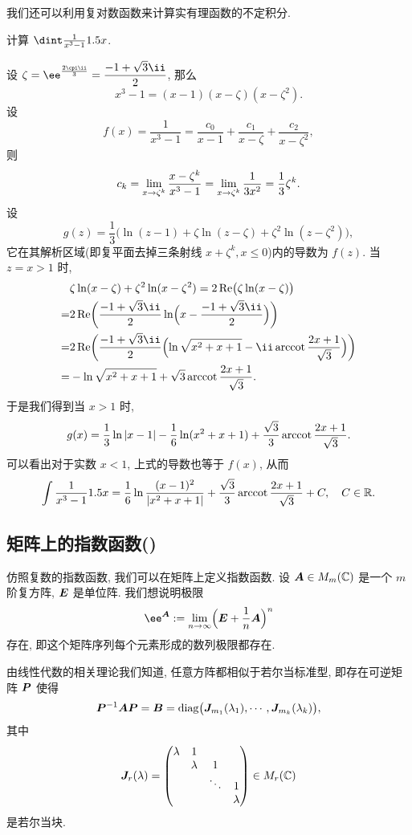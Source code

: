 我们还可以利用复对数函数来计算实有理函数的不定积分.

\begin{example}
  \label{exam:int-rational-function}
  计算 $\dint \frac1{x^3-1}\d x$.
\end{example}
  
\begin{solution}
  设 $\zeta=\ee^{\frac{2\cpi\ii}3}=\dfrac{-1+\sqrt3\ii}2$, 那么
  \[
    x^3-1=(x-1)(x-\zeta)(x-\zeta^2).
  \]
  设
  \[
     f(x)
    =\frac1{x^3-1}
    =\frac{c_0}{x-1}+\frac{c_1}{x-\zeta}+\frac{c_2}{x-\zeta^2},
  \]
  则
  \[
     c_k
    =\lim_{x\rightarrow \zeta^k} \frac{x-\zeta^k}{x^3-1}
    =\lim_{x\rightarrow \zeta^k} \frac1{3x^2}
    =\frac13\zeta^k.
  \]
  设
  \[
    g(z)=\frac13\bigl(
      \ln(z-1)+\zeta\ln(z-\zeta)+\zeta^2\ln(z-\zeta^2)
    \bigr),
  \]
  它在其解析区域(即复平面去掉三条射线 $x+\zeta^k,x\le 0$)内的导数为 $f(z)$.
  当 $z=x>1$ 时, 
  \begin{align*}
     &\zeta\ln(x-\zeta)+\zeta^2\ln(x-\zeta^2)
    =2\Re\bigl(\zeta\ln(x-\zeta)\bigr)\\
    =&2\Re\biggl(\frac{-1+\sqrt3\ii}2\ln\Bigl(x-\frac{-1+\sqrt3\ii}2\Bigr)\biggr)\\
    =&2\Re\biggl(
      \frac{-1+\sqrt3\ii}2
        \Bigl(\ln\sqrt{x^2+x+1}-\ii\arccot\frac{2x+1}{\sqrt3}\Bigr)
      \biggr)\\
    =&-\ln\sqrt{x^2+x+1}
      +\sqrt 3\arccot\frac{2x+1}{\sqrt3}.
  \end{align*}
  于是我们得到当 $x>1$ 时,
  \[
    g(x)=\frac13\ln\left|x-1\right|-\frac16\ln(x^2+x+1)
      +\frac{\sqrt3}3\operatorname{arccot}\frac{2x+1}{\sqrt3}.
  \]
  可以看出对于实数 $x<1$, 上式的导数也等于 $f(x)$, 从而
  \[
    \int\frac1{x^3-1}1.5 x
    =\frac16\ln\frac{(x-1)^2}{|x^2+x+1|}
      +\frac{\sqrt3}3\operatorname{arccot}\frac{2x+1}{\sqrt3}+C,
      \quad C\in{\mathbb{R}}.
  \]
\end{solution}



\subsection{矩阵上的指数函数(\optional)}

仿照复数的指数函数, 我们可以在矩阵上定义指数函数.
设 ${\boldsymbol{A}}\in M_m({\mathbb{C}})$ 是一个 $m$ 阶复方阵, ${\boldsymbol{E}}$ 是单位阵.
我们想说明极限
\[
  \ee^\bfA:=\lim_{n\ra \infty}\Bigl(\bfE+\frac1n \bfA\Bigr)^n
\]
存在, 即这个矩阵序列每个元素形成的数列极限都存在.

由线性代数的相关理论我们知道, 任意方阵都相似于若尔当标准型, 即存在可逆矩阵 ${\boldsymbol{P}}$ 使得
\[
   {\boldsymbol{P}}^{-1}{\boldsymbol{A}}{\boldsymbol{P}}
  ={\boldsymbol{B}}
  ={\mathrm{diag}}\bigl({\boldsymbol{J}}_{m_1}(\lambda_1),\cdots,{\boldsymbol{J}}_{m_k}(\lambda_k)\bigr),
\]
其中
\[
  {\boldsymbol{J}}_r(\lambda)=\begin{pmatrix}
    \lambda&1&   &\\
    &\lambda& 1 &\\
    & &\ddots&1\\
    & &      &\lambda
  \end{pmatrix}\in M_r({\mathbb{C}})
\]
是若尔当块.

